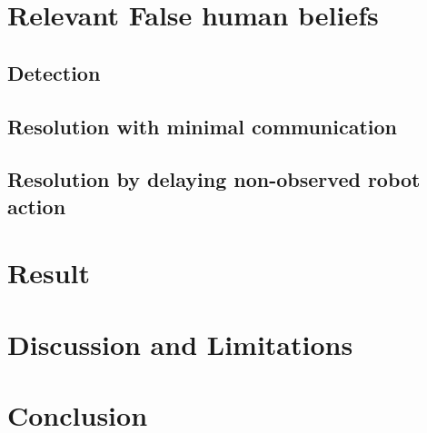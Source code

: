 \section{Relevant False human beliefs}

\subsection{Detection}

\subsection{Resolution with minimal communication}

\subsection{Resolution by delaying non-observed robot action}

\section{Result}

\section{Discussion and Limitations}

\section{Conclusion}